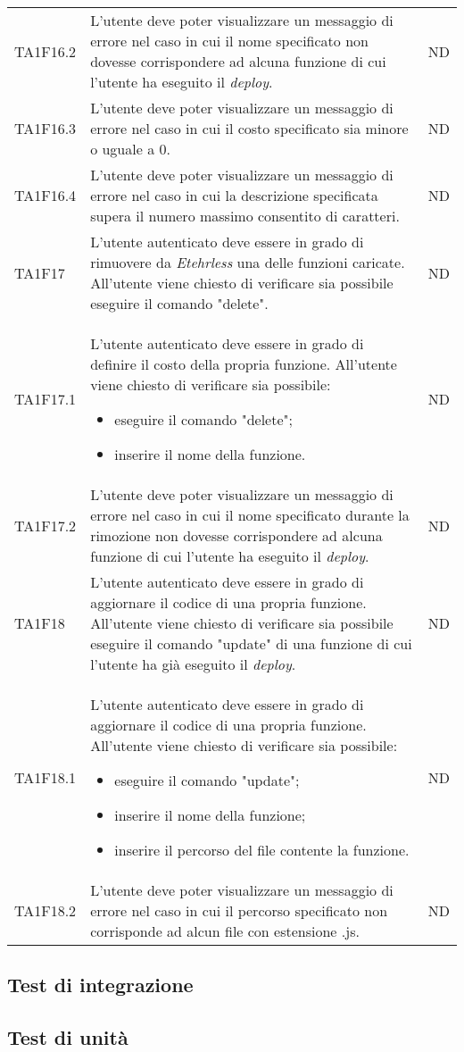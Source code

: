 \begin{longtable}{|C{1.5cm}|C{10cm}|C{1.5cm}|}
	TA1F16.2  &
	L’utente deve poter visualizzare un messaggio di errore nel caso in cui il nome specificato non dovesse corrispondere ad alcuna funzione di cui l'utente ha eseguito il \textit{deploy\glos}. &
	ND \\

	TA1F16.3  &
	L’utente deve poter visualizzare un messaggio di errore nel caso in cui il costo specificato sia minore o uguale a 0. &
	ND \\

	TA1F16.4  &
	L’utente deve poter visualizzare un messaggio di errore nel caso in cui la descrizione specificata supera il numero massimo consentito di caratteri. &
	ND \\

	TA1F17  &
	L'utente autenticato deve essere in grado di rimuovere da \textit{Etehrless} una delle funzioni caricate. All’utente viene chiesto di verificare sia possibile eseguire il comando "delete". &
	ND \\

	TA1F17.1  &
	L'utente autenticato deve essere in grado di definire il costo della propria funzione. All’utente viene chiesto di verificare sia possibile:
	\begin{itemize}
		\item eseguire il comando "delete";
		\item inserire il nome della funzione.
	\end{itemize} &
	ND \\[-5ex]

	TA1F17.2  &
	L’utente deve poter visualizzare un messaggio di errore nel caso in cui il nome specificato durante la rimozione non dovesse corrispondere ad alcuna funzione di cui l'utente ha eseguito il \textit{deploy\glos}. &
	ND \\

	TA1F18  &
	L'utente autenticato deve essere in grado di aggiornare il codice di una propria funzione. All’utente viene chiesto di verificare sia possibile eseguire il comando "update" di una funzione di cui l'utente ha già eseguito il \textit{deploy\glos}. &
	ND \\

	TA1F18.1  &
	L'utente autenticato deve essere in grado di aggiornare il codice di una propria funzione. All’utente viene chiesto di verificare sia possibile:
	\begin{itemize}
		\item eseguire il comando "update";
		\item inserire il nome della funzione;
		\item inserire il percorso del file contente la funzione.
	\end{itemize} &
	ND \\[-5ex]

	TA1F18.2  &
	L’utente deve poter visualizzare un messaggio di errore nel caso in cui il percorso specificato non corrisponde ad alcun file con estensione .js. &
	ND \\
\end{longtable}

\subsection{Test di integrazione}
\subsection{Test di unità}